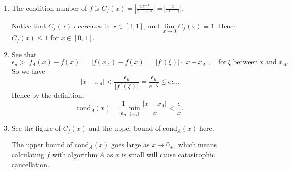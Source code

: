 \documentclass[11pt]{elegantbook}
\begin{document}
\begin{solution}
  \begin{enumerate}[(1)]
    \item The condition number of $f$ is $C_f(x)=\left|\frac{xe^{-x}}{1-e^{-x}}\right|=\left|\frac{x}{e^x-1}\right|.$

    Notice that $C_f(x)$ decreases in $x\in[0,1]$, and $\lim\limits_{x\to 0} C_f(x)=1$. Hence $C_f(x)\leq 1$ for $x\in[0,1]$.
    \item See that
    \begin{equation*}
      \epsilon_u > |f_A(x)-f(x)|=|f(x_A)-f(x)|=|f'(\xi)|\cdot|x-x_A|,\quad \text{for} \;\xi \; \text{between} \; x \; \text{and} \; x_A.
    \end{equation*}
    So we have
    \begin{equation*}
      |x-x_A|< \frac{\epsilon_u}{|f'(\xi)|}=\frac{\epsilon_u}{e^{-\xi}}\leq e\epsilon_u.
    \end{equation*}
    Hence by the definition, 
    \begin{equation*}
      \text{cond}_A(x)=\frac{1}{\epsilon_u}\min_{\{x_A\}}\frac{|x-x_A|}{x}< \frac{e}{x}.
    \end{equation*}
    \item See the figure of $C_f(x)$ and the upper bound of $\text{cond}_A(x)$ here.
    \begin{center}
    \end{center}

    The upper bound of $\text{cond}_A(x)$ goes large as $x\to 0_+$, which means calculating $f$ with algorithm $A$ as $x$ is small will cause catastrophic cancellation.
  \end{enumerate}
\end{solution}
\end{document}
